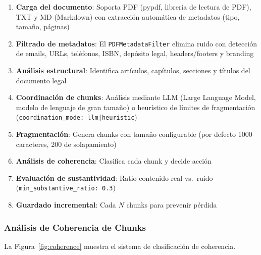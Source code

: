 \documentclass[10pt,twocolumn,letterpaper]{article}
\begin{document}
\begin{enumerate}[nosep,leftmargin=*]
  \item \textbf{Carga del documento}: Soporta PDF (pypdf, librer\'ia de lectura de PDF),
        TXT y MD (Markdown) con extracci\'on autom\'atica de metadatos (tipo, tama\~no, p\'aginas)
  \item \textbf{Filtrado de metadatos}: El \texttt{PDFMetadataFilter} elimina ruido
        con detecci\'on de emails, URLs, tel\'efonos, ISBN, dep\'osito legal,
        headers/footers y branding
  \item \textbf{An\'alisis estructural}: Identifica art\'iculos, cap\'itulos, secciones
        y t\'itulos del documento legal
  \item \textbf{Coordinaci\'on de chunks}: An\'alisis mediante LLM (Large Language Model,
        modelo de lenguaje de gran tama\~no) o heur\'istico de l\'imites
        de fragmentaci\'on (\texttt{coordination\_mode: llm|heuristic})
  \item \textbf{Fragmentaci\'on}: Genera chunks con tama\~no configurable (por defecto
        1000 caracteres, 200 de solapamiento)
  \item \textbf{An\'alisis de coherencia}: Clasifica cada chunk y decide acci\'on
  \item \textbf{Evaluaci\'on de sustantividad}: Ratio contenido real vs.\ ruido
        (\texttt{min\_substantive\_ratio: 0.3})
  \item \textbf{Guardado incremental}: Cada $N$ chunks para prevenir p\'erdida
\end{enumerate}

\subsubsection{An\'alisis de Coherencia de Chunks}

La Figura~\ref{fig:coherence} muestra el sistema de clasificaci\'on de coherencia.
\end{document}
